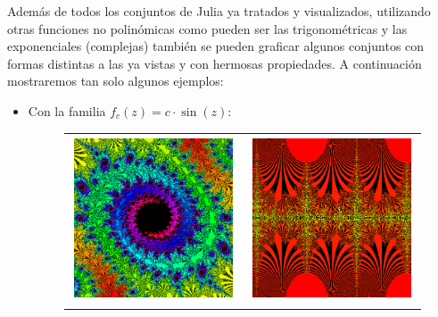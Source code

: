 Además de todos los conjuntos de Julia ya tratados y visualizados, utilizando otras funciones no polinómicas como pueden ser las trigonométricas y las exponenciales (complejas) también se pueden graficar algunos conjuntos con formas distintas a las ya vistas y con hermosas propiedades. A continuación mostraremos tan solo algunos ejemplos:
\newpage
\begin{itemize}
  \item Con la familia $f_c(z)=c\cdot \sin(z)$:
  
\begin{figure}[ht]
  \centering
  \begin{tabular}{cc}
    \includegraphics[scale=0.5]{./img/C3/juliaS-1.png} &   \includegraphics[scale=0.5]{./img/C3/juliaS-2.png}
  \end{tabular}
\end{figure}



\end{itemize}
